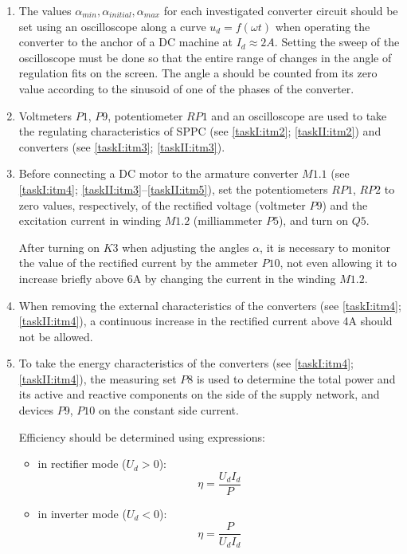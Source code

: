 \documentclass[a4paper,14pt]{article}
\begin{document}
\begin{enumerate}[label=\emph{\arabic*}. , ref=\emph{\thesubsection.\arabic*}, leftmargin=0pt, labelindent=\parindent]
\item The values $\alpha_{min}, \alpha_{initial}, \alpha_{max}$   for each investigated converter circuit 
should be set using an oscilloscope along a curve
$u_d = f (\omega t)$ when operating the converter to the anchor of a DC machine at $I_d \approx 2 A$.
Setting the sweep of the oscilloscope must be done so that the entire range of changes in 
the angle of regulation fits on the screen. 
The angle a should be counted from its zero value according to the sinusoid of one of the phases of the converter.

\item Voltmeters $P1$, $P9$, potentiometer $RP1$ and an oscilloscope are used to take 
the regulating characteristics of SPPC (see \ref{taskI:itm2}; \ref{taskII:itm2}) 
and converters (see \ref{taskI:itm3}; \ref{taskII:itm3}).

\item Before connecting a DC motor to the armature converter $M1.1$ 
(see \ref{taskI:itm4}; \ref{taskII:itm3}--\ref{taskII:itm5}), set the potentiometers $RP1$, $RP2$ to zero values, 
respectively, of the rectified voltage (voltmeter $P9$) and the excitation current in winding $M1.2$ 
(milliammeter $P5$), and turn on $Q5$.

After turning on $K3$ when adjusting the angles $\alpha$, it is necessary to monitor the value of the rectified current 
by the ammeter $P10$, not even allowing it to increase briefly above 6A by changing the current in the winding $M1.2$.

\item When removing the external characteristics of the converters (see \ref{taskI:itm4}; \ref{taskII:itm4}), 
a continuous increase in the rectified current above 4A should not be allowed.

\item To take the energy characteristics of the converters (see \ref{taskI:itm4}; \ref{taskII:itm4}), 
the measuring set $P8$ is used to determine the total power and its active and reactive components on the side 
of the supply network, and devices $P9$, $P10$ on the constant side current.

Efficiency should be determined using expressions:
\begin{itemize}
        \item in rectifier mode ($U_d> 0$):
$$
                \eta = \frac{U_dI_d}{P}
$$
        \item in inverter mode ($U_d <0$):
$$
                \eta = \frac{P}{U_dI_d}
$$


\end{itemize}
\end{enumerate}
\end{document}
